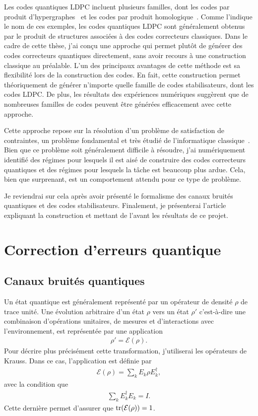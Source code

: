 Les codes quantiques LDPC incluent plusieurs familles,
dont les codes par produit d'hypergraphes~\cite{tillich_quantum_2014}
et les codes par produit homologique~\cite{bravyi_homological_2014}.
Comme l'indique le nom de ces exemples,
les codes quantiques LDPC sont généralement obtenus par le produit 
de structures associées à des codes correcteurs classiques.
Dans le cadre de cette thèse,
j'ai conçu une approche qui permet plutôt de générer des codes correcteurs quantiques
directement,
sans avoir recours à une construction classique au préalable.
L'un des principaux avantages de cette méthode est sa flexibilité 
lors de la construction des codes.
En fait,
cette construction permet théoriquement de générer n'importe quelle famille de codes stabilisateurs,
dont les codes LDPC.
De plus,
les résultats des expériences numériques suggèrent que de nombreuses familles de codes peuvent 
être générées efficacement avec cette approche.

Cette approche repose sur la résolution d'un problème de satisfaction de contraintes,
un problème fondamental et très étudié de l'informatique classique~\cite{lecoutre_constraint_2009}.
Bien que ce problème soit généralement difficile à résoudre,
j'ai numériquement identifié des régimes pour lesquels il est aisé de
construire des codes correcteurs quantiques
et des régimes pour lesquels la tâche est beaucoup plus ardue.
Cela, bien que surprenant, est un comportement attendu pour ce type de problème.

Je reviendrai sur cela après avoir présenté le formalisme des canaux bruités quantiques 
et des codes stabilisateurs.
Finalement,
je présenterai l'article expliquant la construction et 
mettant de l'avant les résultats de ce projet.

\section{Correction d'erreurs quantique}

\subsection{Canaux bruités quantiques}

Un état quantique est généralement représenté par un opérateur de densité $\rho$
de trace unité.
Une évolution arbitraire d'un état $\rho$ vers un état $\rho'$
c'est-à-dire une combinaison d'opérations unitaires,
de mesures et d'interactions avec l'environnement, 
est représentée par une application
\begin{align}
  \rho' = \mathcal{E}(\rho).
\end{align}
Pour décrire plus précisément cette transformation,
j'utiliserai les opérateurs de Krauss.
Dans ce cas,
l'application est définie par
\begin{align}
  \mathcal{E}(\rho) = \sum_{k} E_k \rho E_k^\dag,
\end{align}
avec la condition que 
\begin{align}
  \sum_k E_k^\dag E_k = I.
\end{align}
Cette dernière permet d'assurer que $\tr(\mathcal{E}(\rho)) = 1$.

